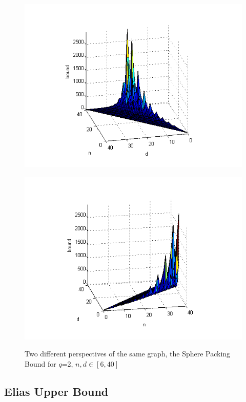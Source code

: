 \documentclass{article}
\theoremstyle{plain}
\theoremstyle{definition}
\begin{document}
\begin{figure}
\centering
\begin{minipage}[ht]{0.45\linewidth}
\includegraphics[width=1.4\linewidth]{sp_1.png}
\label{fig:minipage1}
\end{minipage}
\quad
\begin{minipage}[ht]{0.45\linewidth}
\includegraphics[width=1.4\linewidth]{sp_2.png}
\label{fig:minipage2}
\end{minipage}
\caption{Two different perspectives of the same graph, the Sphere Packing Bound for $q$=2, $n,d\in[6,40]$ }
\end{figure}


\subsection{Elias Upper Bound}
\end{document}
